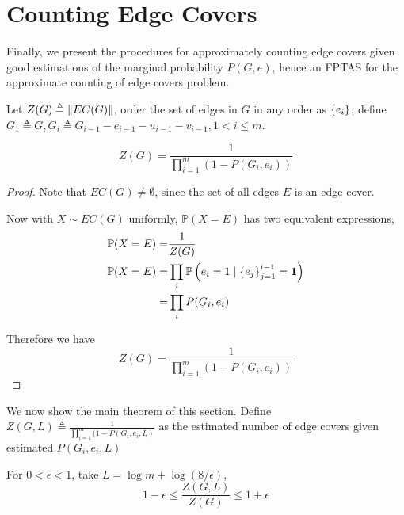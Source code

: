 \section{Counting Edge Covers}

Finally, we present the procedures for approximately counting edge covers given good estimations of the marginal probability $P(G,e)$, hence an FPTAS for the approximate counting of edge covers problem.

\begin{Prop}
	
	Let $Z(G) \triangleq \left\Vert EC(G)\right\Vert$, order the set of edges in $G$ in any order as $\left\{e_i\right\}$, define $G_1 \triangleq G, G_i \triangleq G_{i-1} - e_{i-1} - u_{i-1} - v_{i-1}, 1 < i \leq m $.

	\[ Z(G) = \frac{1}{\prod_{i=1}^m (1 - P(G_i, e_i))} \]

\end{Prop}

\begin{proof}
	Note that $EC(G) \neq \emptyset$, since the set of all edges $E$ is an edge cover.

	Now with $X \sim EC(G)$ uniformly, $\mathbb{P}(X=E)$ has two equivalent expressions,
	\begin{align*}
		\mathbb{P} (X = E) =& \frac{1}{Z(G)} \\
		\mathbb{P} (X = E) =& \prod_i \mathbb{P} \left(e_i = 1 \mid \left\{e_j\right\}_{j=1}^{i-1} = \mathbf{1} \right) \\
		=&\prod_i P(G_i, e_i)
	\end{align*}

	Therefore we have 
	\[ Z(G) = \frac{1}{\prod_{i=1}^m (1 - P(G_i, e_i))} \]
\end{proof}

We now show the main theorem of this section.
Define $Z(G, L) \triangleq \frac{1}{\prod_{i=1}^m (1 - P(G_i, e_i, L)}$ as the estimated number of edge covers given estimated $P(G_i, e_i, L)$

\begin{Thm}
	For $0< \epsilon <1$, take $L=\log m + \log(8/ \epsilon) $, 
	\[ 1- \epsilon \leq \frac{Z(G, L)}{Z(G)} \leq 1+ \epsilon\]
\end{Thm}

